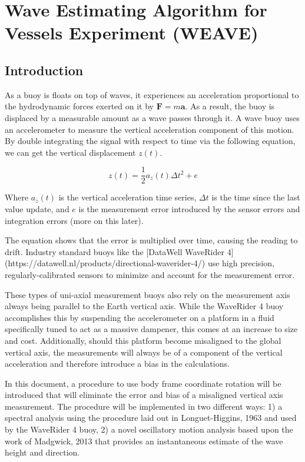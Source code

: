 \chapter{Wave Estimating Algorithm for Vessels Experiment (WEAVE)}

\section{Introduction} \label{sec:weave_intro}

As a buoy is floats on top of waves, it experiences an acceleration proportional to the hydrodynamic forces exerted on it by $\pmb{F} = m\pmb{a}$. 
As a result, the buoy is displaced by a measurable amount as a wave passes through it. 
A wave buoy uses an accelerometer to measure the vertical acceleration component of this motion. 
By double integrating the signal with respect to time via the following equation, we can get the vertical displacement $z(t)$.

\begin{equation}
    z(t) = \frac{1}{2} a_z(t) \Delta t^2 + e
\end{equation}

Where $a_z(t)$ is the vertical acceleration time series, $\Delta t$ is the time since the last value update, and $e$ is the measurement error introduced by the sensor errors and integration errors (more on this later).

The equation shows that the error is multiplied over time, causing the reading to drift. 
Industry standard buoys like the [DataWell WaveRider 4](https://datawell.nl/products/directional-waverider-4/) use high precision, regularly-calibrated sensors to minimize and account for the measurement error.

These types of uni-axial measurement buoys also rely on the measurement axis always being parallel to the Earth vertical axis. 
While the WaveRider 4 buoy accomplishes this by suspending the accelerometer on a platform in a fluid specifically tuned to act as a massive dampener, this comes at an increase to size and cost. 
Additionally, should this platform become misaligned to the global vertical axis, the measurements will always be of a component of the vertical acceleration and therefore introduce a bias in the calculations.

In this document, a procedure to use body frame coordinate rotation will be introduced that will eliminate the error and bias of a misaligned vertical axis measurement. 
The procedure will be implemented in two different ways: 1) a spectral analysis using the procedure laid out in Longuet-Higgins, 1963 and used by the WaveRider 4 buoy, 2) a novel oscillatory motion analysis based upon the work of Madgwick, 2013 that provides an instantaneous estimate of the wave height and direction.


